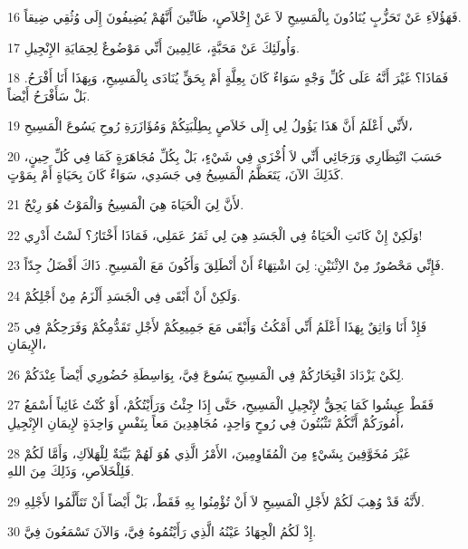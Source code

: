 \par 16 فَهَؤُلاَءِ عَنْ تَحَزُّبٍ يُنَادُونَ بِالْمَسِيحِ لاَ عَنْ إِخْلاَصٍ، ظَانِّينَ أَنَّهُمْ يُضِيفُونَ إِلَى وُثُقِي ضِيقاً.
\par 17 وَأُولَئِكَ عَنْ مَحَبَّةٍ، عَالِمِينَ أَنِّي مَوْضُوعٌ لِحِمَايَةِ الإِنْجِيلِ.
\par 18 فَمَاذَا؟ غَيْرَ أَنَّهُ عَلَى كُلِّ وَجْهٍ سَوَاءٌ كَانَ بِعِلَّةٍ أَمْ بِحَقٍّ يُنَادَى بِالْمَسِيحِ، وَبِهَذَا أَنَا أَفْرَحُ. بَلْ سَأَفْرَحُ أَيْضاً.
\par 19 لأَنِّي أَعْلَمُ أَنَّ هَذَا يَؤُولُ لِي إِلَى خَلاَصٍ بِطِلْبَتِكُمْ وَمُؤَازَرَةِ رُوحِ يَسُوعَ الْمَسِيحِ،
\par 20 حَسَبَ انْتِظَارِي وَرَجَائِي أَنِّي لاَ أُخْزَى فِي شَيْءٍ، بَلْ بِكُلِّ مُجَاهَرَةٍ كَمَا فِي كُلِّ حِينٍ، كَذَلِكَ الآنَ، يَتَعَظَّمُ الْمَسِيحُ فِي جَسَدِي، سَوَاءٌ كَانَ بِحَيَاةٍ أَمْ بِمَوْتٍ.
\par 21 لأَنَّ لِيَ الْحَيَاةَ هِيَ الْمَسِيحُ وَالْمَوْتُ هُوَ رِبْحٌ.
\par 22 وَلَكِنْ إِنْ كَانَتِ الْحَيَاةُ فِي الْجَسَدِ هِيَ لِي ثَمَرُ عَمَلِي، فَمَاذَا أَخْتَارُ؟ لَسْتُ أَدْرِي!
\par 23 فَإِنِّي مَحْصُورٌ مِنْ الاِثْنَيْنِ: لِيَ اشْتِهَاءٌ أَنْ أَنْطَلِقَ وَأَكُونَ مَعَ الْمَسِيحِ. ذَاكَ أَفْضَلُ جِدّاً.
\par 24 وَلَكِنْ أَنْ أَبْقَى فِي الْجَسَدِ أَلْزَمُ مِنْ أَجْلِكُمْ.
\par 25 فَإِذْ أَنَا وَاثِقٌ بِهَذَا أَعْلَمُ أَنِّي أَمْكُثُ وَأَبْقَى مَعَ جَمِيعِكُمْ لأَجْلِ تَقَدُّمِكُمْ وَفَرَحِكُمْ فِي الإِيمَانِ،
\par 26 لِكَيْ يَزْدَادَ افْتِخَارُكُمْ فِي الْمَسِيحِ يَسُوعَ فِيَّ، بِوَاسِطَةِ حُضُورِي أَيْضاً عِنْدَكُمْ.
\par 27 فَقَطْ عِيشُوا كَمَا يَحِقُّ لإِنْجِيلِ الْمَسِيحِ، حَتَّى إِذَا جِئْتُ وَرَأَيْتُكُمْ، أَوْ كُنْتُ غَائِباً أَسْمَعُ أُمُورَكُمْ أَنَّكُمْ تَثْبُتُونَ فِي رُوحٍ وَاحِدٍ، مُجَاهِدِينَ مَعاً بِنَفْسٍ وَاحِدَةٍ لإِيمَانِ الإِنْجِيلِ،
\par 28 غَيْرَ مُخَوَّفِينَ بِشَيْءٍ مِنَ الْمُقَاوِمِينَ، الأَمْرُ الَّذِي هُوَ لَهُمْ بَيِّنَةٌ لِلْهَلاَكِ، وَأَمَّا لَكُمْ فَلِلْخَلاَصِ، وَذَلِكَ مِنَ اللهِ.
\par 29 لأَنَّهُ قَدْ وُهِبَ لَكُمْ لأَجْلِ الْمَسِيحِ لاَ أَنْ تُؤْمِنُوا بِهِ فَقَطْ، بَلْ أَيْضاً أَنْ تَتَأَلَّمُوا لأَجْلِهِ.
\par 30 إِذْ لَكُمُ الْجِهَادُ عَيْنُهُ الَّذِي رَأَيْتُمُوهُ فِيَّ، وَالآنَ تَسْمَعُونَ فِيَّ.

